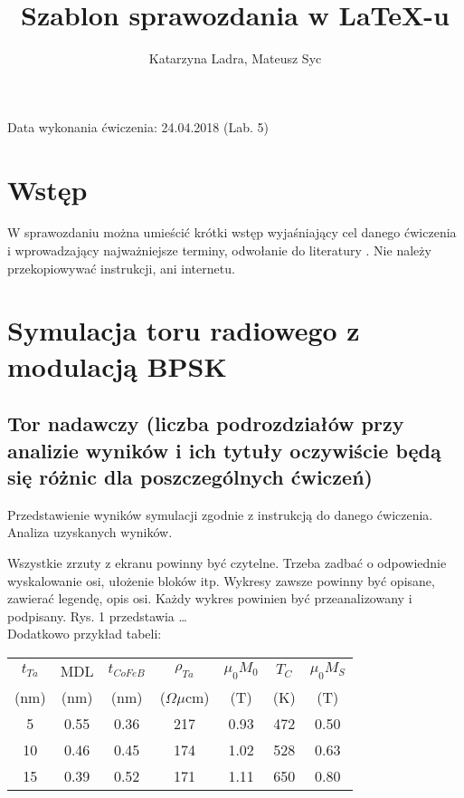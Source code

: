 \documentclass{article}
\author{Katarzyna Ladra, Mateusz Syc}		%
\title{Szablon sprawozdania w \LaTeX-u}		%
\date{}
\begin{document}
\maketitle %


Data wykonania ćwiczenia: 24.04.2018 (Lab. 5)
\\

\section{Wstęp}
W sprawozdaniu można umieścić krótki wstęp
wyjaśniający cel danego ćwiczenia i wprowadzający najważniejsze terminy, odwołanie do literatury \cite{USRP, Szostka, IQ, ieee}. Nie należy przekopiowywać instrukcji, ani internetu.

\section{Symulacja toru radiowego z modulacją BPSK}

\subsection{Tor nadawczy (liczba podrozdziałów przy analizie wyników i ich tytuły oczywiście będą się różnic dla poszczególnych ćwiczeń)}

Przedstawienie wyników symulacji zgodnie z instrukcją do danego ćwiczenia. Analiza uzyskanych wyników.



Wszystkie zrzuty z ekranu powinny być czytelne. Trzeba zadbać o odpowiednie wyskalowanie osi, ułożenie bloków itp. Wykresy zawsze powinny być opisane, zawierać legendę, opis osi. Każdy wykres powinien być przeanalizowany i podpisany. Rys. 1 przedstawia … \\

Dodatkowo przykład tabeli:

\begin{table}[!ht]
\label{tab:Static}
\centering
\begin{tabular}{ccccccc}
$t_{Ta}$ & MDL & $t_{CoFeB}$ & $\rho_{Ta}$ & $\mu_{0}M_{0}$ & $T_{C}$ & $\mu_{0}M_{S}$ \\
(nm) & (nm) & (nm) & ($\Omega\mu$cm) & (T) & (K) & (T) \\
\hline
5 & 0.55 & 0.36 & 217 & 0.93 & 472 & 0.50 \\
10 & 0.46 & 0.45 & 174 & 1.02 & 528 & 0.63 \\
15 & 0.39 & 0.52 & 171 & 1.11 & 650 & 0.80 \\
\end{tabular}
\end{table}
\end{document}
